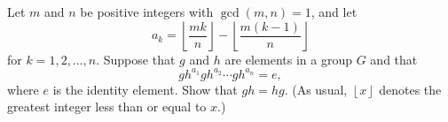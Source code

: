 Let $m$ and $n$ be positive integers with $\gcd\left(m,n\right)=1$, and let \[a_k=\left\lfloor\frac{mk}{n}\right\rfloor-\left\lfloor\frac{m\left(k-1\right)}{n}\right\rfloor\] for $k=1,2,\ldots,n$. Suppose that $g$ and $h$ are elements in a group $G$ and that \[gh^{a_1}gh^{a_2}\cdots gh^{a_n}=e,\] where $e$ is the identity element. Show that $gh=hg$. (As usual, $\left\lfloor x\right\rfloor$ denotes the greatest integer less than or equal to $x$.)
